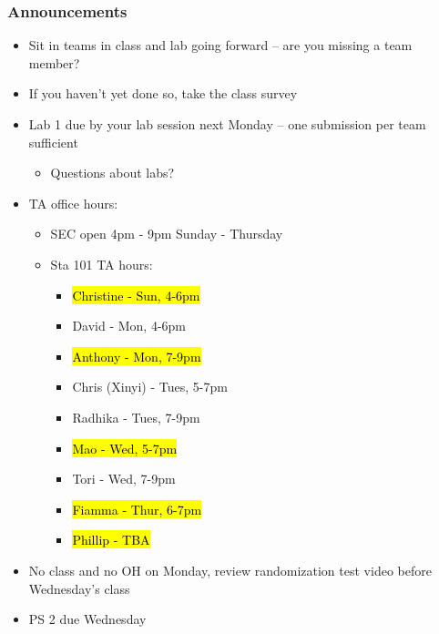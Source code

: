\documentclass[11pt,containsverbatim,handout,xcolor=xelatex,dvipsnames,table]{beamer}
\begin{document}
\begin{frame}
\frametitle{Announcements}

\begin{itemize}

\item Sit in teams in class and lab going forward -- are you missing a team member?

\item If you haven't yet done so, take the class survey

\item Lab 1 due by your lab session next Monday -- one submission per team sufficient
\begin{itemize}
\item Questions about labs?
\end{itemize}

\item TA office hours:
\begin{itemize}

\item SEC open 4pm - 9pm Sunday - Thursday

\item Sta 101 TA hours:
\vspace{-0.25cm}
\begin{multicols}{2}
\begin{itemize}
\item \hl{Christine - Sun, 4-6pm}
\item David - Mon, 4-6pm
\item \hl{Anthony - Mon, 7-9pm}
\item Chris (Xinyi) - Tues, 5-7pm
\item Radhika - Tues, 7-9pm
\item \hl{Mao - Wed, 5-7pm}
\item Tori - Wed, 7-9pm
\item \hl{Fiamma - Thur, 6-7pm}
\item \hl{Phillip - TBA}
\end{itemize}
\end{multicols}
\vspace{-0.25cm}
\end{itemize}

\item No class and no OH on Monday, review randomization test video before Wednesday's class

\item PS 2 due Wednesday

\end{itemize}

\end{frame}
\end{document}
